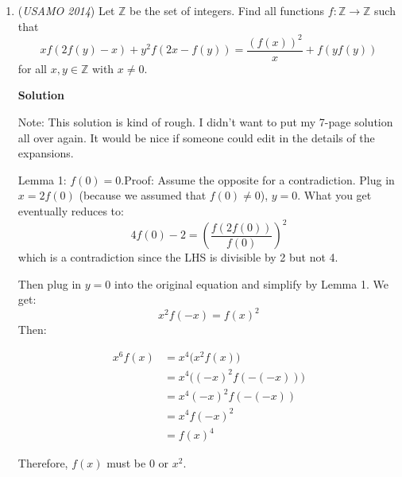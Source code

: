 \begin{enumerate}
	\item (\textit{USAMO 2014}) Let $\mathbb{Z}$ be the set of integers. Find all functions $f : \mathbb{Z} \rightarrow \mathbb{Z}$ such that 
 \[xf(2f(y)-x)+y^2f(2x-f(y))=\frac{(f(x))^2}{x}+f(yf(y))\] for all $x, y \in \mathbb{Z}$ with $x \neq 0$.


 



\textbf{Solution}

Note: This solution is kind of rough. I didn't want to put my 7-page solution all over again. It would be nice if someone could edit in the details of the expansions.

 Lemma 1: $f(0) = 0$.Proof: Assume the opposite for a contradiction. Plug in $x = 2f(0)$ (because we assumed that $f(0) \neq 0$), $y = 0$. What you get eventually reduces to:
 \[4f(0)-2 = \left( \frac{f(2f(0))}{f(0)} \right)^2\]which is a contradiction since the LHS is divisible by 2 but not 4.

 Then plug in $y = 0$ into the original equation and simplify by Lemma 1. We get:
 \[x^2f(-x) = f(x)^2\]Then:

 
 \begin{align*} x^6f(x) &= x^4\bigl(x^2f(x)\bigr)\\ &= x^4\bigl((-x)^2f(-(-x))\bigr)\\ &= x^4(-x)^2f(-(-x))\\ &= x^4f(-x)^2\\ &= f(x)^4 \end{align*}


 Therefore, $f(x)$ must be 0 or $x^2$.


\end{enumerate}
